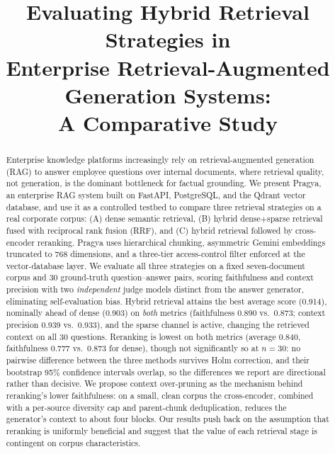 \documentclass[conference]{IEEEtran}
\begin{document}
\title{Evaluating Hybrid Retrieval Strategies in\\
Enterprise Retrieval-Augmented Generation Systems:\\
A Comparative Study}

\author{%

}

\maketitle

\begin{abstract}
Enterprise knowledge platforms increasingly rely on retrieval-augmented
generation (RAG) to answer employee questions over internal documents, where
retrieval quality, not generation, is the dominant bottleneck for factual
grounding. We present Pragya, an enterprise RAG system built on FastAPI,
PostgreSQL, and the Qdrant vector database, and use it as a controlled testbed
to compare three retrieval strategies on a real corporate corpus: (A) dense
semantic retrieval, (B) hybrid dense$+$sparse retrieval fused with reciprocal
rank fusion (RRF), and (C) hybrid retrieval followed by cross-encoder
reranking. Pragya uses hierarchical chunking, asymmetric Gemini embeddings
truncated to 768 dimensions, and a three-tier access-control filter enforced at
the vector-database layer. We evaluate all three strategies on a fixed
seven-document corpus and 30 ground-truth question--answer pairs, scoring
faithfulness and context precision with two \emph{independent} judge models
distinct from the answer generator, eliminating self-evaluation bias. Hybrid
retrieval attains the best average score (0.914), nominally ahead of dense
(0.903) on \emph{both} metrics (faithfulness 0.890 vs.\ 0.873; context precision
0.939 vs.\ 0.933), and the sparse channel is active, changing the retrieved
context on all 30 questions. Reranking is lowest on both metrics (average 0.840,
faithfulness 0.777 vs.\ 0.873 for dense), though not significantly so at $n=30$:
no pairwise difference between the three methods survives Holm correction, and
their bootstrap 95\% confidence intervals overlap, so the differences we report
are directional rather than decisive. We propose context over-pruning as the
mechanism behind reranking's lower faithfulness: on a small, clean corpus the
cross-encoder, combined with a per-source diversity cap and parent-chunk
deduplication, reduces the generator's context to about four blocks. Our results
push back on the assumption that reranking is uniformly beneficial and suggest
that the value of each retrieval stage is contingent on corpus characteristics.
\end{abstract}
\end{document}
